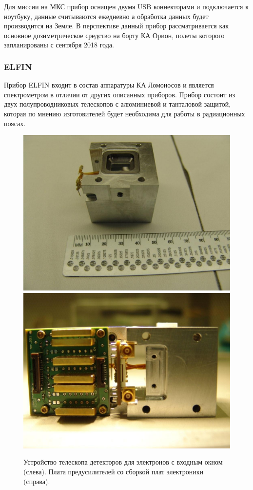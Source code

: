 Для миссии на МКС прибор оснащен двумя USB коннекторами и подключается к ноутбуку, данные считываются ежедневно а обработка данных будет производится на Земле. В перспективе данный прибор рассматривается как основное дозиметрическое средство на борту КА Орион, полеты которого запланированы с сентября 2018 года.


\subsubsection{ELFIN}
Прибор ELFIN входит в состав аппаратуры КА Ломоносов и является спектрометром в отличии от других описанных приборов. Прибор состоит из двух полупроводниковых телескопов с алюминиевой и танталовой защитой, которая по мнению изготовителей будет необходима для работы в радиационных поясах.\cite{VassilisAngelopoulos}

\begin{figure}
	\centering
	\includegraphics[width=0.49\linewidth]{images/elfin/DSC04260}
	\includegraphics[width=0.49\linewidth]{images/elfin/DSC04287}
	\caption{Устройство телескопа детекторов для электронов с входным окном (слева). 	Плата предусилителей со сборкой плат электроники (справа). }
	\label{fig:dsc04260}
\end{figure}


